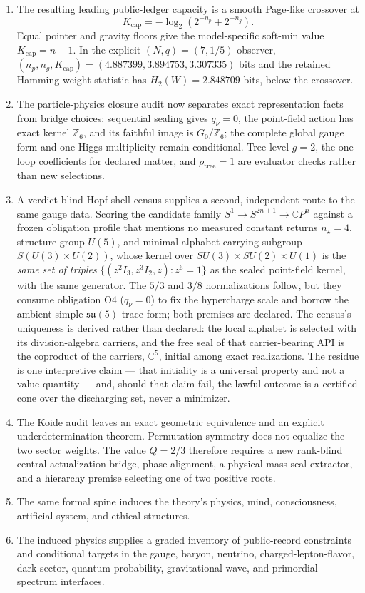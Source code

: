 \documentclass[11pt]{article}
\theoremstyle{plain}
\theoremstyle{definition}
\theoremstyle{remark}
\newcommand{\C}{\mathbb{C}}
\newcommand{\SM}{SU(3)\times SU(2)\times U(1)}
\begin{document}
\begin{enumerate}[leftmargin=*]
\item The resulting leading public-ledger capacity is a smooth Page-like crossover at
\[
K_{\mathrm{cap}}=-\log_2(2^{-n_p}+2^{-n_g}).
\]
Equal pointer and gravity floors give the model-specific soft-min value \(K_{\mathrm{cap}}=n-1\). In the explicit \((N,q)=(7,1/5)\) observer, \((n_p,n_g,K_{\mathrm{cap}})=(4.887399,3.894753,3.307335)\) bits and the retained Hamming-weight statistic has \(H_2(W)=2.848709\) bits, below the crossover.
\item The particle-physics closure audit now separates exact representation facts from bridge choices: sequential sealing gives \(q_\nu=0\), the point-field action has exact kernel \(\mathbb Z_6\), and its faithful image is \(G_0/\mathbb Z_6\); the complete global gauge form and one-Higgs multiplicity remain conditional. Tree-level \(g=2\), the one-loop coefficients for declared matter, and \(\rho_{\mathrm{tree}}=1\) are evaluator checks rather than new selections.
\item A verdict-blind Hopf shell census supplies a second, independent route to the same gauge data. Scoring the candidate family \(S^1\to S^{2n+1}\to\C P^n\) against a frozen obligation profile that mentions no measured constant returns \(n_\star=4\), structure group \(U(5)\), and minimal alphabet-carrying subgroup \(S(U(3)\times U(2))\), whose kernel over \(\SM\) is the \emph{same set of triples} \(\{(z^2I_3,z^3I_2,z):z^6=1\}\) as the sealed point-field kernel, with the same generator. The \(5/3\) and \(3/8\) normalizations follow, but they consume obligation O4 (\(q_\nu=0\)) to fix the hypercharge scale and borrow the ambient simple \(\mathfrak{su}(5)\) trace form; both premises are declared. The census's uniqueness is derived rather than declared: the local alphabet is selected with its division-algebra carriers, and the free seal of that carrier-bearing API is the coproduct of the carriers, \(\C^5\), initial among exact realizations. The residue is one interpretive claim --- that initiality is a universal property and not a value quantity --- and, should that claim fail, the lawful outcome is a certified cone over the discharging set, never a minimizer.
\item The Koide audit leaves an exact geometric equivalence and an explicit underdetermination theorem. Permutation symmetry does not equalize the two sector weights. The value \(Q=2/3\) therefore requires a new rank-blind central-actualization bridge, phase alignment, a physical mass-seal extractor, and a hierarchy premise selecting one of two positive roots.
\item The same formal spine induces the theory's physics, mind, consciousness, artificial-system, and ethical structures.
\item The induced physics supplies a graded inventory of public-record constraints and conditional targets in the gauge, baryon, neutrino, charged-lepton-flavor, dark-sector, quantum-probability, gravitational-wave, and primordial-spectrum interfaces.
\end{enumerate}
\end{document}
